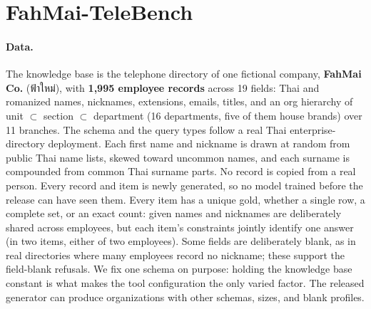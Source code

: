 \documentclass[11pt]{article}
\begin{document}
\section{FahMai-TeleBench}

\paragraph{Data.} The knowledge base is the telephone directory of one fictional company, \textbf{FahMai
Co.} (ฟ้าใหม่), with \textbf{1{,}995 employee records} across 19 fields: Thai and romanized names,
nicknames, extensions, emails, titles, and an org hierarchy of unit $\subset$ section $\subset$ department
(16 departments, five of them house brands) over 11 branches. The schema and the query types follow a
real Thai enterprise-directory deployment. Each first name and nickname is drawn at random from public
Thai name lists, skewed toward uncommon names, and each surname is compounded from common Thai surname
parts. No record is copied from a real person. Every record and item is newly generated, so no model
trained before the release can have seen them. Every item has a unique gold, whether a single row, a complete set, or an exact count: given
names and nicknames are deliberately shared across employees, but each item's constraints jointly
identify one answer (in two items, either of two employees). Some fields are deliberately blank, as in real directories where many employees
record no nickname; these support the field-blank refusals. We fix one schema on purpose: holding the
knowledge base constant is what makes the tool configuration the only varied factor. The released
generator can produce organizations with other schemas, sizes, and blank profiles.
\end{document}
